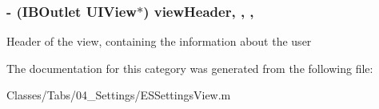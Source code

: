 \subsubsection[{view\+Header}]{\setlength{\rightskip}{0pt plus 5cm}-\/ (I\+B\+Outlet U\+I\+View$\ast$) view\+Header\hspace{0.3cm}{\ttfamily [read]}, {\ttfamily [write]}, {\ttfamily [nonatomic]}, {\ttfamily [strong]}}\label{category_e_s_settings_view_07_08_acf033cccb7b67db231b0cd5d7b7a79c5}
Header of the view, containing the information about the user 

The documentation for this category was generated from the following file\+:\begin{DoxyCompactItemize}
\item 
Classes/\+Tabs/04\+\_\+\+Settings/E\+S\+Settings\+View.\+m\end{DoxyCompactItemize}
